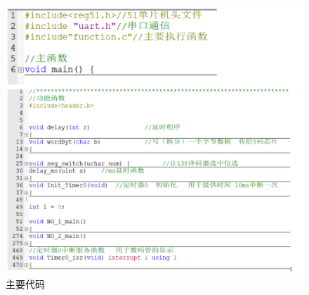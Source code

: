 \documentclass{textreportclass}  %
\begin{document}
	\begin{figure}[htbp]
		\centering
		\includegraphics[scale=0.5]{Fig/代码.png}
		\caption{主要代码}\label{Fig.41}
	\end{figure}
	
\end{document}

